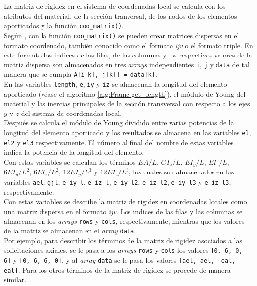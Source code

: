 La matriz de rigidez en el sistema de coordenadas local se calcula con los atributos del material, de la sección tranversal, de los nodos de los elementos aporticados y la función \verb|coo_matrix()|.\\

Según \cite{2020SciPy-NMeth}, con la función \verb|coo_matrix()| se pueden crear matrices dispersas en el formato coordenado, también conocido como el formato \emph{ijv} o el formato triple. En este formato los indices de las filas, de las columnas y los respectivos valores de la matriz dispersa son almacenados en tres \emph{arrays} independientes \verb|i|, \verb|j| y \verb|data| de tal manera que se cumpla \verb|A[i[k], j[k]] = data[k]|.\\

En las variables \verb|length|, \verb|e|, \verb|iy| y \verb|iz| se almacenan la longitud del elemento aporticado (véase el algoritmo \ref{alg:Frame-get_length}), el módulo de Young del material y las inercias principales de la sección transversal con respecto a los ejes $ y $ y $ z $ del sistema de coordenadas local.\\

Después se calcula el módulo de Young dividido entre varias potencias de la longitud del elemento aporticado y los resultados se almacena en las variables \verb|el|, \verb|el2| y \verb|el3| respectivamente. El número al final del nombre de estas variables indica la potencia de la longitud del elemento.\\

Con estas variables se calculan los términos $ EA / L $, $ GI_x / L $, $ EI_y / L $, $ EI_z / L $, $ 6EI_y / L^2 $, $ 6EI_z / L^2 $, $ 12EI_y / L^3 $ y $ 12EI_z / L^3 $, los cuales son almacenados en las variables \verb|ael|, \verb|gjl|, \verb|e_iy_l|, \verb|e_iz_l|, \verb|e_iy_l2|, \verb|e_iz_l2|, \verb|e_iy_l3| y \verb|e_iz_l3|, respectivamente.\\

Con estas variables se describe la matriz de rigidez en coordenadas locales como una matriz dispersa en el formato \emph{ijv}. Los indices de las filas y las columnas se almacenan en los \emph{arrays} \verb|rows| y \verb|cols|, respectivamente, mientras que los valores de la matriz se almacenan en el \emph{array} \verb|data|.\\

Por ejemplo, para describir los términos de la matriz de rigidez asociados a las solicitaciones axiales, se le pasa a los \emph{arrays} \verb|rows| y \verb|cols| los valores \verb|[0, 6, 0, 6]| y \verb|[0, 6, 6, 0]|, y al \emph{array} \verb|data| se le pasa los valores \verb|[ael, ael, -eal, -eal]|. Para los otros términos de la matriz de rigidez se procede de manera similar.\\

